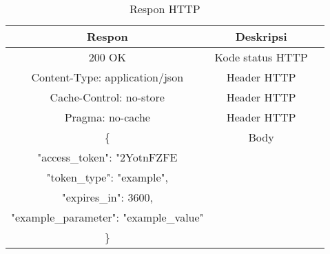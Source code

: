 \begin{table}[h]
    \caption{Respon HTTP}
    \vspace{0.5em}
    \centering
    \begin{tabular}{|c|c|c|}
        \hline
        Respon & Deskripsi \\
        \hline \hline
        200 OK & Kode status HTTP \\
        \hline
        Content-Type: application/json & Header HTTP \\
        \hline
        Cache-Control: no-store & Header HTTP \\
        \hline
        Pragma: no-cache & Header HTTP \\
        \hline
        \{ & Body \\
        \hline
        "access\_token": "2YotnFZFE & \\
        \hline
        "token\_type": "example", & \\
        \hline
        "expires\_in": 3600, & \\
        \hline
        "example\_parameter": "example\_value" & \\
        \hline
        \} & \\
        \hline
    \end{tabular}
    \label{tab:res_http}
\end{table}